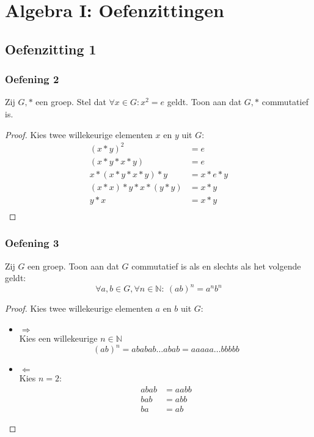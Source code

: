 \documentclass[main.tex]{subfiles}
\begin{document}
\chapter{Algebra I: Oefenzittingen}
\label{cha:algebra-i-oefenzittingen}

\section{Oefenzitting 1}


\subsection*{Oefening 2}
\label{oz1-oef2}
Zij $G,*$ een groep.
Stel dat $\forall x \in G: x^{2} = e$ geldt.
Toon aan dat $G,*$ commutatief is.

\begin{proof}
  Kies twee willekeurige elementen $x$ en $y$ uit $G$:
  \[ 
  \begin{array}{rl}
  (x*y)^{2} &= e\\
  (x*y*x*y) &= e\\
  x*(x*y*x*y)*y &= x*e*y\\
  (x*x)*y*x*(y*y) &= x*y\\
  y*x &= x*y\\
  \end{array}
  \]
\end{proof}

\subsection*{Oefening 3}
Zij $G$ een groep.
Toon aan dat $G$ commutatief is als en slechts als het volgende geldt:
\[ \forall a,b \in G, \forall n \in \mathbb{N}:\ (ab)^{n} = a^{n}b^{n} \]

\begin{proof}
  Kies twee willekeurige elementen $a$ en $b$ uit $G$:
  \begin{itemize}
  \item $\Rightarrow$\\
    Kies een willekeurige $n\in \mathbb{N}$
    \[ (ab)^{n} = ababab \ldots abab = aaaaa \ldots bbbbb \]
  \item $\Leftarrow$\\
    Kies $n=2$:
    \[ 
    \begin{array}{rl}
       abab &= aabb\\
       bab &= abb\\
       ba &= ab
    \end{array}
    \]
  \end{itemize}
\end{proof}
\end{document}
